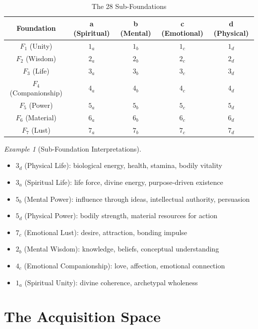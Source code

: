 \documentclass[11pt,twoside,openright]{book}
\theoremstyle{definition}
\theoremstyle{plain}
\theoremstyle{remark}
\newtheorem{example}[definition]{Example}
\begin{document}
\begin{table}[ht]
\centering
\caption{The 28 Sub-Foundations}
\label{tab:28-subfoundations}
\begin{tabular}{c|cccc}
\toprule
\textbf{Foundation} & \textbf{a (Spiritual)} & \textbf{b (Mental)} & \textbf{c (Emotional)} & \textbf{d (Physical)} \\
\midrule
$F_1$ (Unity) & $1_a$ & $1_b$ & $1_c$ & $1_d$ \\
$F_2$ (Wisdom) & $2_a$ & $2_b$ & $2_c$ & $2_d$ \\
$F_3$ (Life) & $3_a$ & $3_b$ & $3_c$ & $3_d$ \\
$F_4$ (Companionship) & $4_a$ & $4_b$ & $4_c$ & $4_d$ \\
$F_5$ (Power) & $5_a$ & $5_b$ & $5_c$ & $5_d$ \\
$F_6$ (Material) & $6_a$ & $6_b$ & $6_c$ & $6_d$ \\
$F_7$ (Lust) & $7_a$ & $7_b$ & $7_c$ & $7_d$ \\
\bottomrule
\end{tabular}
\end{table}

\begin{example}[Sub-Foundation Interpretations]
\label{ex:subfoundation-interpretations}
\begin{itemize}
  \item $3_d$ (Physical Life): biological energy, health, stamina, bodily vitality
  \item $3_a$ (Spiritual Life): life force, divine energy, purpose-driven existence
  \item $5_b$ (Mental Power): influence through ideas, intellectual authority, persuasion
  \item $5_d$ (Physical Power): bodily strength, material resources for action
  \item $7_c$ (Emotional Lust): desire, attraction, bonding impulse
  \item $2_b$ (Mental Wisdom): knowledge, beliefs, conceptual understanding
  \item $4_c$ (Emotional Companionship): love, affection, emotional connection
  \item $1_a$ (Spiritual Unity): divine coherence, archetypal wholeness
\end{itemize}
\end{example}

\section{The Acquisition Space}
\end{document}
